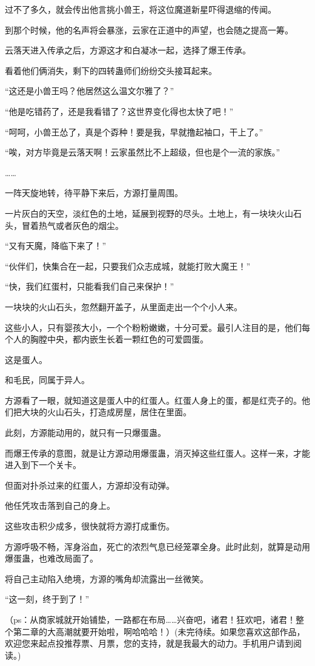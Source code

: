 \begin{this_body}
过不了多久，就会传出他言挑小兽王，将这位魔道新星吓得退缩的传闻。

到那个时候，他的名声将会暴涨，云家在正道中的声望，也会随之提高一筹。

云落天进入传承之后，方源这才和白凝冰一起，选择了爆王传承。

看着他们俩消失，剩下的四转蛊师们纷纷交头接耳起来。

“这还是小兽王吗？他居然这么温文尔雅了？”

“他是吃错药了，还是我看错了？这世界变化得也太快了吧！”

“呵呵，小兽王怂了，真是个孬种！要是我，早就撸起袖口，干上了。”

“唉，对方毕竟是云落天啊！云家虽然比不上超级，但也是个一流的家族。”

……

一阵天旋地转，待平静下来后，方源打量周围。

一片灰白的天空，淡红色的土地，延展到视野的尽头。土地上，有一块块火山石头，冒着热气或者灰色的烟尘。

“又有天魔，降临下来了！”

“伙伴们，快集合在一起，只要我们众志成城，就能打败大魔王！”

“快，我们红蛋村，只能看我们自己来保护！”

一块块的火山石头，忽然翻开盖子，从里面走出一个个小人来。

这些小人，只有婴孩大小，一个个粉粉嫩嫩，十分可爱。最引人注目的是，他们每个人的胸膛中央，都内嵌生长着一颗红色的可爱圆蛋。

这是蛋人。

和毛民，同属于异人。

方源看了一眼，就知道这是蛋人中的红蛋人。红蛋人身上的蛋，都是红壳子的。他们把大块的火山石头，打造成房屋，居住在里面。

此刻，方源能动用的，就只有一只爆蛋蛊。

而爆王传承的意图，就是让方源动用爆蛋蛊，消灭掉这些红蛋人。这样一来，才能进入到下一个关卡。

但面对扑杀过来的红蛋人，方源却没有动弹。

他任凭攻击落到自己的身上。

这些攻击积少成多，很快就将方源打成重伤。

方源呼吸不畅，浑身浴血，死亡的浓烈气息已经笼罩全身。此时此刻，就算是动用爆蛋蛊，也难改局面了。

将自己主动陷入绝境，方源的嘴角却流露出一丝微笑。

“这一刻，终于到了！”

（ps：从商家城就开始铺垫，一路都在布局……兴奋吧，诸君！狂欢吧，诸君！整个第二章的大高潮就要开始啦，啊哈哈哈！）(未完待续。如果您喜欢这部作品，欢迎您来起点投推荐票、月票，您的支持，就是我最大的动力。手机用户请到阅读。)

\end{this_body}

